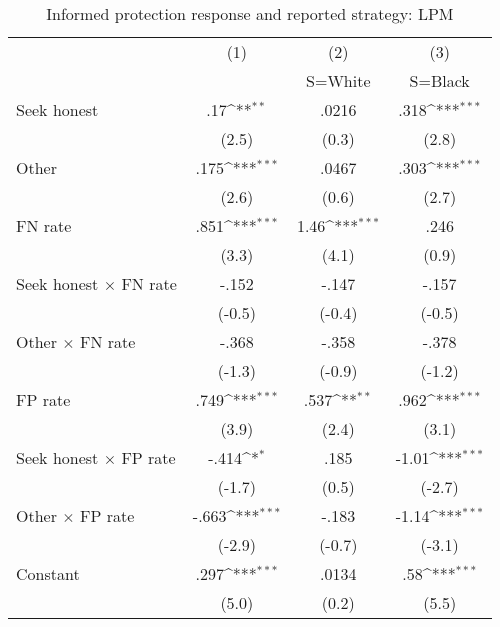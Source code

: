 \begin{table}[htbp]\centering
\def\sym#1{\ifmmode^{#1}\else\(^{#1}\)\fi}
\caption{Informed protection response and reported strategy: LPM}
\begin{tabular}{l*{3}{c}}
\hline\hline
                &\multicolumn{1}{c}{(1)}&\multicolumn{1}{c}{(2)}&\multicolumn{1}{c}{(3)}\\
                &\multicolumn{1}{c}{}&\multicolumn{1}{c}{S=White}&\multicolumn{1}{c}{S=Black}\\
\hline
Seek honest     &      .17\sym{**} &    .0216         &     .318\sym{***}\\
                &    (2.5)         &    (0.3)         &    (2.8)         \\
Other           &     .175\sym{***}&    .0467         &     .303\sym{***}\\
                &    (2.6)         &    (0.6)         &    (2.7)         \\
FN rate         &     .851\sym{***}&     1.46\sym{***}&     .246         \\
                &    (3.3)         &    (4.1)         &    (0.9)         \\
Seek honest $\times$ FN rate&    -.152         &    -.147         &    -.157         \\
                &   (-0.5)         &   (-0.4)         &   (-0.5)         \\
Other $\times$ FN rate&    -.368         &    -.358         &    -.378         \\
                &   (-1.3)         &   (-0.9)         &   (-1.2)         \\
FP rate         &     .749\sym{***}&     .537\sym{**} &     .962\sym{***}\\
                &    (3.9)         &    (2.4)         &    (3.1)         \\
Seek honest $\times$ FP rate&    -.414\sym{*}  &     .185         &    -1.01\sym{***}\\
                &   (-1.7)         &    (0.5)         &   (-2.7)         \\
Other $\times$ FP rate&    -.663\sym{***}&    -.183         &    -1.14\sym{***}\\
                &   (-2.9)         &   (-0.7)         &   (-3.1)         \\
Constant        &     .297\sym{***}&    .0134         &      .58\sym{***}\\
                &    (5.0)         &    (0.2)         &    (5.5)         \\

\end{tabular}
\end{table}
